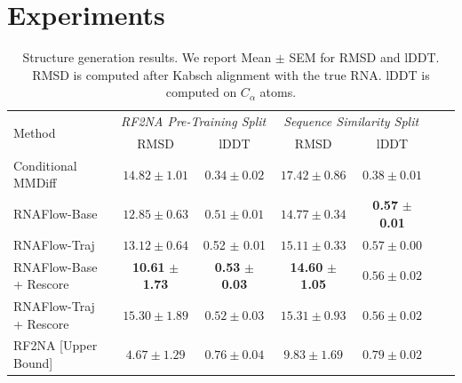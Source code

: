 
\section{Experiments}

\begin{table}[t!]
    \centering
    \small
    \caption{Structure generation results. We report Mean $\pm$ SEM for RMSD and lDDT. RMSD is computed after Kabsch alignment with the true RNA. lDDT is computed on $C_{\alpha}$ atoms.}
    \vspace{0.05in}
    \begin{tabular}{lccc@{\hskip 0.25in}ccc}
        \hline
        \multirow{2}{*}{Method} &
        \multicolumn{2}{c}{\textit{RF2NA Pre-Training Split}} &
        \multicolumn{2}{c}{\textit{Sequence Similarity Split}} \\
        & RMSD & lDDT & RMSD & lDDT \\ \hline
        Conditional MMDiff & $14.82 \pm 1.01$ & $0.34 \pm 0.02$ & $17.42 \pm 0.86$ & $0.38 \pm 0.01$ \\ \hline
        RNAFlow-Base & $12.85 \pm 0.63$ & $0.51 \pm 0.01$ & $14.77 \pm 0.34$ & \textbf{0.57} $\pm$ \textbf{0.01} \\
        RNAFlow-Traj & $13.12 \pm 0.64$ & 0.52 $\pm$ 0.01 & $15.11 \pm 0.33$ & $0.57 \pm 0.00$ \\
        RNAFlow-Base + Rescore & \textbf{10.61} $\pm$ \textbf{1.73} & \textbf{0.53} $\pm$ \textbf{0.03} & \textbf{14.60} $\pm$ \textbf{1.05} & $0.56 \pm 0.02$ \\
        RNAFlow-Traj + Rescore & $15.30 \pm 1.89$ & $0.52 \pm 0.03$ & $15.31 \pm 0.93$ & $0.56 \pm 0.02$ \\
         \hline
        RF2NA [Upper Bound] & $4.67 \pm 1.29$ & $0.76 \pm 0.04$ & $9.83 \pm 1.69$ & $0.79 \pm 0.02$ \\ \hline
    \end{tabular}
    
    \label{tab:1}
\end{table}



